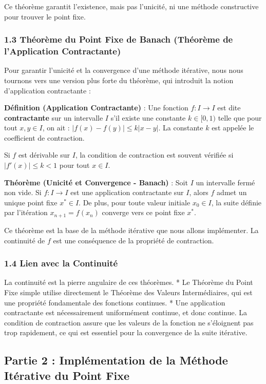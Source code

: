\documentclass[12pt,a4paper]{report}
\begin{document}
Ce théorème garantit l'existence, mais pas l'unicité, ni une méthode constructive pour trouver le point fixe.

\subsubsection{1.3 Théorème du Point Fixe de Banach (Théorème de l'Application Contractante)}

Pour garantir l'unicité et la convergence d'une méthode itérative, nous nous tournons vers une version plus forte du théorème, qui introduit la notion d'application contractante :

\textbf{Définition (Application Contractante)} : Une fonction $f: I \to I$ est dite \textbf{contractante} sur un intervalle $I$ s'il existe une constante $k \in [0, 1)$ telle que pour tout $x, y \in I$, on ait :
$|f(x) - f(y)| \le k|x - y|$.
La constante $k$ est appelée le coefficient de contraction.

Si $f$ est dérivable sur $I$, la condition de contraction est souvent vérifiée si $|f'(x)| \le k < 1$ pour tout $x \in I$.

\textbf{Théorème (Unicité et Convergence - Banach)} : Soit $I$ un intervalle fermé non vide. Si $f: I \to I$ est une application contractante sur $I$, alors $f$ admet un unique point fixe $x^* \in I$. De plus, pour toute valeur initiale $x_0 \in I$, la suite définie par l'itération $x_{n+1} = f(x_n)$ converge vers ce point fixe $x^*$.

Ce théorème est la base de la méthode itérative que nous allons implémenter. La continuité de $f$ est une conséquence de la propriété de contraction.

\subsubsection{1.4 Lien avec la Continuité}

La continuité est la pierre angulaire de ces théorèmes.
*   Le Théorème du Point Fixe simple utilise directement le Théorème des Valeurs Intermédiaires, qui est une propriété fondamentale des fonctions continues.
*   Une application contractante est nécessairement uniformément continue, et donc continue. La condition de contraction assure que les valeurs de la fonction ne s'éloignent pas trop rapidement, ce qui est essentiel pour la convergence de la suite itérative.

\subsection{Partie 2 : Implémentation de la Méthode Itérative du Point Fixe}
\end{document}
